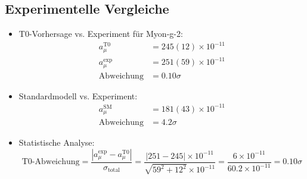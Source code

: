\documentclass[12pt,a4paper]{article}
\begin{document}
\subsection{Experimentelle Vergleiche}
\begin{itemize}
	\item T0-Vorhersage vs. Experiment für Myon-g-2:
	\begin{align}
		a_\mu^{\text{T0}} &= 245(12) \times 10^{-11} \\
		a_\mu^{\text{exp}} &= 251(59) \times 10^{-11} \\
		\text{Abweichung} &= 0.10\sigma
	\end{align}
	
	\item Standardmodell vs. Experiment:
	\begin{align}
		a_\mu^{\text{SM}} &= 181(43) \times 10^{-11} \\
		\text{Abweichung} &= 4.2\sigma
	\end{align}
	
	\item Statistische Analyse:
	\begin{equation}
		\text{T0-Abweichung} = \frac{|a_\mu^{\text{exp}} - a_\mu^{\text{T0}}|}{\sigma_{\text{total}}} = \frac{|251 - 245| \times 10^{-11}}{\sqrt{59^2 + 12^2} \times 10^{-11}} = \frac{6 \times 10^{-11}}{60.2 \times 10^{-11}} = 0.10\sigma
	\end{equation}
\end{itemize}
\end{document}
